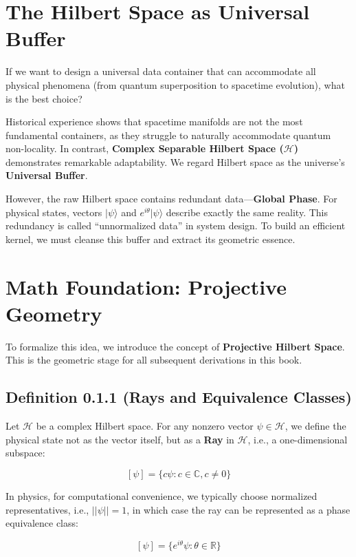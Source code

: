 \section{The Hilbert Space as Universal Buffer}

If we want to design a universal data container that can accommodate all physical phenomena (from quantum superposition to spacetime evolution), what is the best choice?

Historical experience shows that spacetime manifolds are not the most fundamental containers, as they struggle to naturally accommodate quantum non-locality. In contrast, \textbf{Complex Separable Hilbert Space ($\mathcal{H}$)} demonstrates remarkable adaptability. We regard Hilbert space as the universe's \textbf{Universal Buffer}.

However, the raw Hilbert space contains redundant data---\textbf{Global Phase}. For physical states, vectors $|\psi\rangle$ and $e^{i\theta}|\psi\rangle$ describe exactly the same reality. This redundancy is called ``unnormalized data'' in system design. To build an efficient kernel, we must cleanse this buffer and extract its geometric essence.

\section{Math Foundation: Projective Geometry}

To formalize this idea, we introduce the concept of \textbf{Projective Hilbert Space}. This is the geometric stage for all subsequent derivations in this book.

\subsection{Definition 0.1.1 (Rays and Equivalence Classes)}

Let $\mathcal{H}$ be a complex Hilbert space. For any nonzero vector $\psi \in \mathcal{H}$, we define the physical state not as the vector itself, but as a \textbf{Ray} in $\mathcal{H}$, i.e., a one-dimensional subspace:

$$[\psi] = \{ c\psi : c \in \mathbb{C}, c \neq 0 \}$$

In physics, for computational convenience, we typically choose normalized representatives, i.e., $||\psi|| = 1$, in which case the ray can be represented as a phase equivalence class:

$$[\psi] = \{ e^{i\theta}\psi : \theta \in \mathbb{R} \}$$

